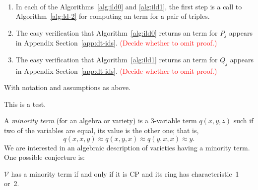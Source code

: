 \begin{remarks}\
\begin{enumerate}[1.] 
\item In each of the Algorithms~\ref{alg:ild0} and \ref{alg:ild1},
the first step is a call to Algorithm~\ref{alg:ld-2} 
for computing an \ld term for a pair of triples.
\item The easy verification that Algorithm~\ref{alg:ild0} returns
an \ld term for $P_j$ appears in Appendix Section~\ref{app:dt-ids}. 
\textcolor{red}{(Decide whether to omit proof.)}
\item The easy verification that Algorithm~\ref{alg:ild1} returns
an \ld term for $Q_j$ appears in Appendix Section~\ref{app:dt-ids}. 
\textcolor{red}{(Decide whether to omit proof.)}
\end{enumerate}
\end{remarks}


























With notation and assumptions as above.

\begin{theorem}
This is a test.
\end{theorem}







%




A \emph{minority term} (for an algebra or variety) is a 
3-variable term $q(x,y,z)$ such if two of the variables
are equal, its value is the other one; that is, 
\[
q(x,x,y) \approx q(x,y,x) \approx q(y,x,x) \approx y.
\]
We are interested in an algebraic description of varieties having
a minority term. One possible conjecture is:
\begin{conjecture}
$\mathcal V$ has a minority term if and only if it is CP and its
ring has characteristic~1 or~2.
\end{conjecture}




